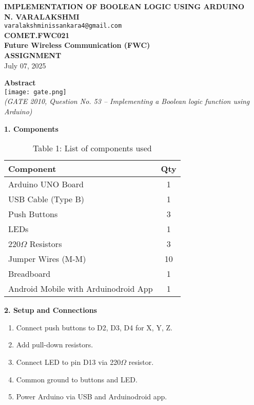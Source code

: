 \documentclass[12pt]{article}
\begin{document}
\begin{center}
    \textbf{\Large IMPLEMENTATION OF BOOLEAN LOGIC USING ARDUINO} \\[10pt]
    \textbf{N. VARALAKSHMI} \\
    \texttt{varalakshminissankara4@gmail.com} \\
    \textbf{COMET.FWC021} \\
    \textbf{Future Wireless Communication (FWC)} \\
    \textbf{ASSIGNMENT} \\[5pt]
    July 07, 2025
\end{center}

\vspace{1em}

\begin{multicols}{2}

\noindent\textbf{Abstract} \\[0.5em]
\texttt{[image: gate.png]} \\[0.5em]
\textit{(GATE 2010, Question No. 53 – Implementing a Boolean logic function using Arduino)}

\vspace{1em}
\noindent\textbf{1. Components}
\begin{table}[H]
\small
\centering
\begin{tabular}{|p{4.2cm}|c|}
\hline
\textbf{Component} & \textbf{Qty} \\
\hline
Arduino UNO Board & 1 \\
USB Cable (Type B) & 1 \\
Push Buttons & 3 \\
LEDs & 1 \\
220$\Omega$ Resistors & 3 \\
Jumper Wires (M-M) & 10 \\
Breadboard & 1 \\
Android Mobile with Arduinodroid App & 1 \\
\hline
\end{tabular}
\caption*{Table 1: List of components used}
\end{table}

\vspace{1em}
\noindent\textbf{2. Setup and Connections}
\begin{enumerate}
    \item Connect push buttons to D2, D3, D4 for X, Y, Z.
    \item Add pull-down resistors.
    \item Connect LED to pin D13 via 220$\Omega$ resistor.
    \item Common ground to buttons and LED.
    \item Power Arduino via USB and Arduinodroid app.
\end{enumerate}


\end{multicols}
\end{document}
